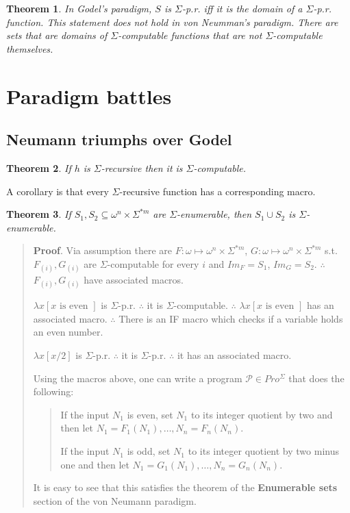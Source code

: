 \documentclass[a4paper, 12pt]{article}
\newtheorem{theorem}{Theorem}
\newtheorem{theorem}{Theorem}
\begin{document}
\begin{theorem}
    In Godel's paradigm, $S$ is $\Sigma$-p.r. iff it is the domain of a
    $\Sigma$-p.r. function. This statement \textit{does not hold} in von
    Neumman's paradigm. There are sets that are domains of $\Sigma$-computable
    functions that are not $\Sigma$-computable themselves.
\end{theorem}

\pagebreak 

\section{Paradigm battles}

\subsection{Neumann triumphs over Godel}

\begin{theorem}
    If $h$ is $\Sigma$-recursive then it is $\Sigma$-computable.
\end{theorem}

A corollary is that every $\Sigma$-recursive function has a corresponding macro.

\begin{theorem}
    If $S_1, S_2 \subseteq \omega^{n} \times \Sigma^{*m} $ are
    $\Sigma$-enumerable, then $S_1 \cup S_2$ is $\Sigma$-enumerable. 
\end{theorem}


\small
\begin{quote}

\textbf{Proof}. Via assumption there are $F : \omega \mapsto \omega^{n} \times
\Sigma^{*m} $, $G : \omega \mapsto \omega^{n} \times \Sigma^{*m} $ s.t.
$F_{(i)}, G_{(i)}$ are $\Sigma$-computable for every $i$ and $Im_F = S_1$, $Im_G =
S_2$. $\therefore $ $F_{(i)}, G_{(i)}$ have associated macros. 

$\lambda x \left[ x \text{ is even }  \right]$ is $\Sigma$-p.r. $\therefore $  it
is $\Sigma$-computable. $\therefore $ $\lambda x \left[ x \text{ is even }
\right]$ has an associated macro. $\therefore $ There is an IF macro which
checks if a variable holds an even number.

$\lambda x \left[ x/2  \right]$ is $\Sigma$-p.r. $\therefore $ it is
$\Sigma$-p.r. $\therefore $ it has an associated macro.

Using the macros above, one can write a program $\mathcal{P} \in Pro^{\Sigma}$
that does the following: 

\footnotesize
\begin{quote}
    If the input $N_1$ is even, set $N_1$ to its integer quotient by two and
    then let $N_1 = F_1(N_1), \ldots, N_n = F_n(N_n)$. 

    If the input $N_1$ is odd, set $N_1$ to its integer quotient by two minus
    one and then let $N_1 = G_1(N_1), \ldots, N_n = G_n(N_n)$. 
\end{quote}

It is easy to see that this satisfies the theorem of the \textbf{Enumerable
sets} section of the von Neumann paradigm.

\end{quote}
\normalsize
\end{document}
